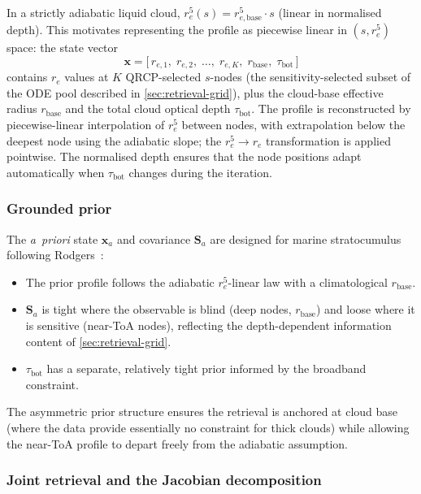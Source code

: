 \documentclass[11pt,a4paper]{article}
\newcommand{\vect}[1]{\bm{#1}}
\newcommand{\mat}[1]{\mathbf{#1}}
\theoremstyle{definition}
\begin{document}
In a strictly adiabatic liquid cloud, $r_e^5(s) = r_{e,\mathrm{base}}^5
\cdot s$ (linear in normalised depth).  This motivates representing the
profile as piecewise linear in $(s, r_e^5)$ space: the state vector
\begin{equation}\label{eq:state}
  \vect{x} = \bigl[\,r_{e,1},\; r_{e,2},\; \ldots,\; r_{e,K},\;
  r_{\mathrm{base}},\; \tau_{\mathrm{bot}}\,\bigr]
\end{equation}
contains $r_e$ values at $K$ QRCP-selected $s$-nodes (the
sensitivity-selected subset of the ODE pool described in
\cref{sec:retrieval-grid}), plus the cloud-base effective radius
$r_{\mathrm{base}}$ and the total cloud optical depth
$\tau_{\mathrm{bot}}$.  The profile is reconstructed by
piecewise-linear interpolation of $r_e^5$ between nodes, with
extrapolation below the deepest node using the adiabatic slope; the
$r_e^5 \to r_e$ transformation is applied pointwise.  The normalised
depth ensures that the node positions adapt automatically when
$\tau_{\mathrm{bot}}$ changes during the iteration.

\subsubsection{Grounded prior}

The \emph{a~priori} state $\vect{x}_a$ and covariance $\mat{S}_a$ are
designed for marine stratocumulus following Rodgers~\cite{rodgers2000}:
\begin{itemize}[nosep]
  \item The prior profile follows the adiabatic $r_e^5$-linear law with
    a climatological $r_{\mathrm{base}}$.
  \item $\mat{S}_a$ is tight where the observable is blind (deep nodes,
    $r_{\mathrm{base}}$) and loose where it is sensitive (near-ToA nodes),
    reflecting the depth-dependent information content of
    \cref{sec:retrieval-grid}.
  \item $\tau_{\mathrm{bot}}$ has a separate, relatively tight prior
    informed by the broadband constraint.
\end{itemize}
The asymmetric prior structure ensures the retrieval is anchored at
cloud base (where the data provide essentially no constraint for thick
clouds) while allowing the near-ToA profile to depart freely from the
adiabatic assumption.

\subsubsection{Joint retrieval and the Jacobian decomposition}
\end{document}
